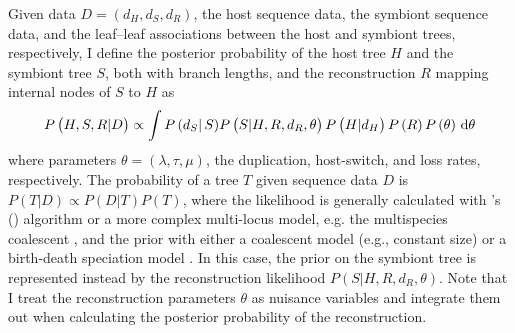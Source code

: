 \documentclass[12pt,letterpaper]{article}
\newcommand{\citeapos}[1]{\citeauthor{#1}'s (\citeyear{#1})}
\begin{document}

%
%
%

Given data $D = \left(d_H,d_S,d_R\right)$, the host sequence data, the symbiont sequence data, and the leaf--leaf associations between the host and symbiont trees, respectively, I define the posterior probability of the host tree $H$ and the symbiont tree $S$, both with branch lengths, and the reconstruction $R$ mapping internal nodes of $S$ to $H$ as
\begin{equation}
P\left(H,S,R|D\right) \propto \int P\left(d_S\right|S) P\left(S|H,R,d_R,\theta\right) P\left(H|d_H\right) P\left(R\right) P\left(\theta\right) \, \dif \theta
\end{equation}
where parameters $\theta = \left(\lambda,\tau,\mu\right)$, the duplication, host-switch, and loss rates, respectively. The probability of a tree $T$ given sequence data $D$ is $P\left(T|D\right) \propto P\left(D|T\right) P\left(T\right)$, where the likelihood is generally calculated with \citeapos{Felsenstein:1981} algorithm or a more complex multi-locus model, e.g. the multispecies coalescent \parencite{Heled:2010a}, and the prior with either a coalescent model (e.g., constant size) or a birth-death speciation model \parencite{Gernhard:2008}. In this case, the prior on the symbiont tree is represented instead by the reconstruction likelihood $P\left(S|H,R,d_R,\theta\right)$. Note that I treat the reconstruction parameters $\theta$ as nuisance variables and integrate them out when calculating the posterior probability of the reconstruction.
\end{document}
